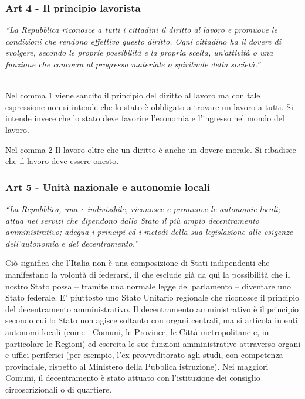 \documentclass{report}
\begin{document}



\subsubsection{Art 4 - Il principio lavorista}

\textit{“La Repubblica riconosce a tutti i cittadini il diritto al lavoro e promuove le condizioni che rendono effettivo questo
diritto.
Ogni cittadino ha il dovere di svolgere, secondo le proprie possibilità e la propria scelta, un’attività o una funzione che
concorra al progresso materiale o spirituale della società.”}

\\

Nel comma 1 viene sancito il principio del diritto al lavoro ma con tale espressione non si intende che lo stato è
obbligato a trovare un lavoro a tutti. Si intende invece che lo stato deve favorire l’economia e l’ingresso nel mondo del
lavoro.

Nel comma 2 Il lavoro oltre che un diritto è anche un dovere morale. Si ribadisce che il lavoro deve essere onesto.

\subsubsection{Art 5 - Unità nazionale e autonomie locali}

\textit{“La Repubblica, una e indivisibile, riconosce e promuove le autonomie locali; attua nei servizi che dipendono dallo
Stato il più ampio decentramento amministrativo; adegua i principi ed i metodi della sua legislazione alle esigenze
dell'autonomia e del decentramento.”}

Ciò significa che l’Italia non è una composizione di Stati indipendenti che manifestano la volontà di federarsi, il che
esclude già da qui la possibilità che il nostro Stato possa – tramite una normale legge del parlamento – diventare uno
Stato federale. E’ piuttosto uno Stato Unitario regionale che riconosce il principio del decentramento
amministrativo. Il decentramento amministrativo è il principio secondo cui lo Stato non agisce soltanto con
organi centrali, ma si articola in enti autonomi locali (come i Comuni, le Province, le Città metropolitane e, in
particolare le Regioni) ed esercita le sue funzioni amministrative attraverso organi e uffici periferici (per esempio, l’ex
provveditorato agli studi, con competenza provinciale, rispetto al Ministero della Pubblica istruzione). Nei maggiori
Comuni, il decentramento è stato attuato con l'istituzione dei consiglio circoscrizionali o di quartiere.
\end{document}
